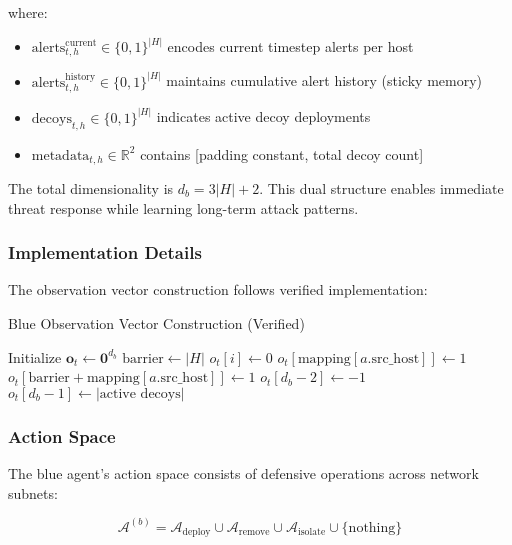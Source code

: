 \documentclass[11pt]{article}
\theoremstyle{definition}
\theoremstyle{plain}
\newcommand{\MC}[1]{\mathcal{#1}}
\begin{document}
where:
\begin{itemize}
    \item $\text{alerts}_{t,h}^{\text{current}} \in \{0,1\}^{|H|}$ encodes current timestep alerts per host
    \item $\text{alerts}_{t,h}^{\text{history}} \in \{0,1\}^{|H|}$ maintains cumulative alert history (sticky memory)
    \item $\text{decoys}_{t,h} \in \{0,1\}^{|H|}$ indicates active decoy deployments
    \item $\text{metadata}_{t,h} \in \mathbb{R}^2$ contains [padding constant, total decoy count]
\end{itemize}

The total dimensionality is $d_b = 3|H| + 2$. This dual structure enables immediate threat response while learning long-term attack patterns.

\subsubsection{Implementation Details}
The observation vector construction follows verified implementation:

\begin{algorithm}
\caption{Blue Observation Vector Construction (Verified)}
\begin{algorithmic}[1]
\STATE Initialize $\mathbf{o}_t \leftarrow \mathbf{0}^{d_b}$
\STATE $\text{barrier} \leftarrow |H|$
    \STATE $o_t[i] \leftarrow 0$ 
\ENDFOR
\FOR{each alert $a \in \MC{A}_t$}
        \STATE $o_t[\text{mapping}[a.\text{src\_host}]] \leftarrow 1$
        \STATE $o_t[\text{barrier} + \text{mapping}[a.\text{src\_host}]] \leftarrow 1$ 
    \ENDIF
\ENDFOR
\STATE $o_t[d_b-2] \leftarrow -1$ 
\STATE $o_t[d_b-1] \leftarrow |\text{active decoys}|$ 
\end{algorithmic}
\end{algorithm}

\subsubsection{Action Space}
The blue agent's action space consists of defensive operations across network subnets:

\begin{equation}
\MC{A}^{(b)} = \MC{A}_{\text{deploy}} \cup \MC{A}_{\text{remove}} \cup \MC{A}_{\text{isolate}} \cup \{\text{nothing}\}
\end{equation}
\end{document}
